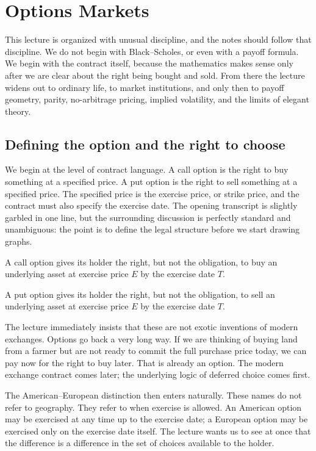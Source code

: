 \chapter{Options Markets}

This lecture is organized with unusual discipline, and the notes should follow that discipline. We do not begin with Black--Scholes, or even with a payoff formula. We begin with the contract itself, because the mathematics makes sense only after we are clear about the right being bought and sold. From there the lecture widens out to ordinary life, to market institutions, and only then to payoff geometry, parity, no-arbitrage pricing, implied volatility, and the limits of elegant theory.

\section{Defining the option and the right to choose}

We begin at the level of contract language. A call option is the right to buy something at a specified price. A put option is the right to sell something at a specified price. The specified price is the exercise price, or strike price, and the contract must also specify the exercise date. The opening transcript is slightly garbled in one line, but the surrounding discussion is perfectly standard and unambiguous: the point is to define the legal structure before we start drawing graphs.

\begin{definition}
A call option gives its holder the right, but not the obligation, to buy an underlying asset at exercise price $E$ by the exercise date $T$.
\end{definition}

\begin{definition}
A put option gives its holder the right, but not the obligation, to sell an underlying asset at exercise price $E$ by the exercise date $T$.
\end{definition}

The lecture immediately insists that these are not exotic inventions of modern exchanges. Options go back a very long way. If we are thinking of buying land from a farmer but are not ready to commit the full purchase price today, we can pay now for the right to buy later. That is already an option. The modern exchange contract comes later; the underlying logic of deferred choice comes first.

The American--European distinction then enters naturally. These names do not refer to geography. They refer to when exercise is allowed. An American option may be exercised at any time up to the exercise date; a European option may be exercised only on the exercise date itself. The lecture wants us to see at once that the difference is a difference in the set of choices available to the holder.

